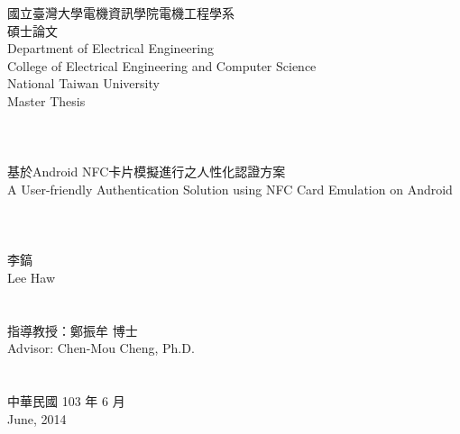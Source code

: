 \documentclass[12pt]{report}
\begin{document}
\onehalfspacing

\begin{titlepage}
\begin{center}

\begin{CJK}{UTF8}{bkai}
\Large{{國立臺灣大學電機資訊學院電機工程學系\\碩士論文}}\\
\large{{Department of Electrical Engineering}}\\
\large{College of Electrical Engineering and Computer Science}\\
\Large{{National Taiwan University}}\\
\Large{{Master Thesis}}\\

\hspace*{1cm}~\\
\hspace*{1cm}~\\
\hspace*{1cm}~\\
\Large{基於Android NFC卡片模擬進行之人性化認證方案\\
A User-friendly Authentication Solution using NFC Card Emulation on Android }\\
\hspace*{1cm}~\\
\hspace*{1cm}~\\
\hspace*{1cm}~\\

\Large{李鎬\\Lee Haw}\\
\hspace*{1cm}~\\
\hspace*{1cm}~\\

\Large{指導教授：鄭振牟 博士\\Advisor: Chen-Mou Cheng, Ph.D.}\\
\hspace*{1cm}~\\
\hspace*{1cm}~\\


\Large{中華民國 103 年 6 月\\June, 2014}\\

\end{CJK}
\end{center}
\end{titlepage}
\end{document}
